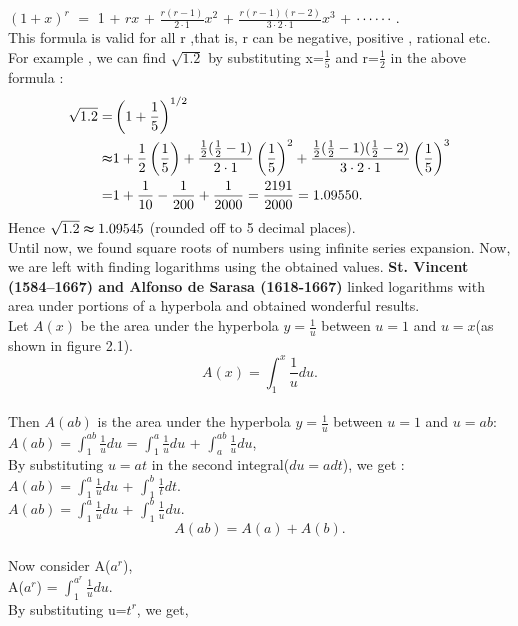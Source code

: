 \documentclass[a4paper,reqno,11pt]{book}
\theoremstyle{plain}%
\theoremstyle{definition}
\begin{document}
$(1+x)^r$ $=$ 1 + $rx$ +   $\frac{r(r-1)}{2\cdot1}$$x^2$ +  $\frac{r(r-1)(r-2)}{3\cdot2\cdot1}$$x^3$ + $\cdots\cdots.\\$
\\

\noindent This formula is valid for all r ,that is, r can be negative, positive , rational etc.
For example , we can find $\sqrt{1.2}$ by substituting x=$\frac{1}{5}$ and r=$\frac{1}{2}$ in the above formula :\\
\begin{align*}
\sqrt{1.2}=& \left(1 + \frac{1}{5}\right)^{1/2} \\
\indent \thickapprox& 1 +  \frac{1}{2}\left(\frac{1}{5}\right)  +  \frac{ \frac{1}{2}(\frac{1}{2}-1)}{2\cdot1}\left(\frac{1}{5}\right)^2  + \frac{ \frac{1}{2}(\frac{1}{2}-1)(\frac{1}{2}-2)}{3\cdot2\cdot1}\left(\frac{1}{5}\right)^3 \\
\indent =& 1 +  \frac{1}{10}  -  \frac{1}{200} + \frac{1}{2000} = \frac{2191}{2000} = 1.09550.\\
\end{align*}
Hence $\sqrt{1.2} \thickapprox 1.09545$ (rounded off to 5 decimal places).\\
Until now, we found square roots of numbers using infinite series expansion.
Now, we are left with finding logarithms using the obtained values.
\textbf{St. Vincent (1584--1667) and Alfonso de Sarasa (1618-1667)} linked logarithms with area under portions of a hyperbola and obtained wonderful results.\\
Let $A(x)$ be the area under the hyperbola $y =\frac{1}{u}$  between $u = 1 $ and $u = x$(as shown in figure 2.1).
$$A(x) = \int_{1}^{x}\frac{1}{u}du .$$ \\
Then $A(ab)$ is the area under the hyperbola $y=\frac{1}{u}$ between $u=1$ and $u=ab$:\\
$A(ab) = \int_{1}^{ab}\frac{1}{u}du $ = $\int_{1}^{a}\frac{1}{u}du$ + 
$\int_{a}^{ab}\frac{1}{u}du$,\\
By substituting $u=at$ in the second integral($du=adt$), we get :\\
$A(ab)= \int_{1}^{a}\frac{1}{u}du$ + $\int_{1}^{b}\frac{1}{t}dt$.\\
\noindent $A(ab)= \int_{1}^{a}\frac{1}{u}du$ + $\int_{1}^{b}\frac{1}{u}du$.\\
$$\textbf{$A(ab)=A(a)+A(b).$}$$\\
Now consider A($a^r$),\\
A($a^r$) = $\int_{1}^{a^r}\frac{1}{u}du$.\\
By substituting u=$t^r$, we get,\\
\end{document}
